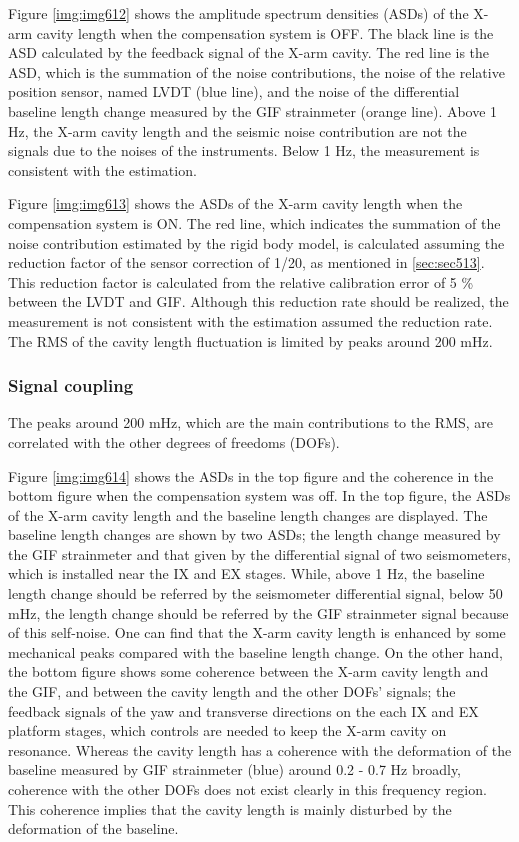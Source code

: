 Figure \ref{img:img612} shows the amplitude spectrum densities (ASDs) of the X-arm cavity length when the compensation system is OFF. The black line is the ASD calculated by the feedback signal of the X-arm cavity. The red line is the ASD, which is the summation of the noise contributions, the noise of the relative position sensor, named LVDT (blue line), and the noise of the differential baseline length change measured by the GIF strainmeter (orange line). Above 1 Hz, the X-arm cavity length and the seismic noise contribution are not the signals due to the noises of the instruments. Below 1 Hz, the measurement is consistent with the estimation.

Figure \ref{img:img613} shows the ASDs of the X-arm cavity length when the compensation system is ON. The red line, which indicates the summation of the noise contribution estimated by the rigid body model, is calculated assuming the reduction factor of the sensor correction of 1/20, as mentioned in \cref{sec:sec513}. This reduction factor is calculated from the relative calibration error of 5 \% between the LVDT and GIF. Although this reduction rate should be realized, the measurement is not consistent with the estimation assumed the reduction rate. The RMS of the cavity length fluctuation is limited by peaks around 200 mHz.

\subsubsection{Signal coupling}\label{sec:533}
The peaks around 200 mHz, which are the main contributions to the RMS, are correlated with the other degrees of freedoms (DOFs). 

Figure \ref{img:img614} shows the ASDs in the top figure and the coherence in the bottom figure when the compensation system was off. In the top figure, the ASDs of the X-arm cavity length and the baseline length changes are displayed. The baseline length changes are shown by two ASDs; the length change measured by the GIF strainmeter and that given by the differential signal of two seismometers, which is installed near the IX and EX stages. While, above 1 Hz, the baseline length change should be referred by the seismometer differential signal, below 50 mHz, the length change should be referred by the GIF strainmeter signal because of this self-noise. One can find that the X-arm cavity length is enhanced by some mechanical peaks compared with the baseline length change. On the other hand, the bottom figure shows some coherence between the X-arm cavity length and the GIF, and between the cavity length and the other DOFs' signals; the feedback signals of the yaw and transverse directions on the each IX and EX platform stages, which controls are needed to keep the X-arm cavity on resonance. Whereas the cavity length has a coherence with the deformation of the baseline measured by GIF strainmeter (blue) around 0.2 - 0.7 Hz broadly, coherence with the other DOFs does not exist clearly in this frequency region. This coherence implies that the cavity length is mainly disturbed by the deformation of the baseline.

